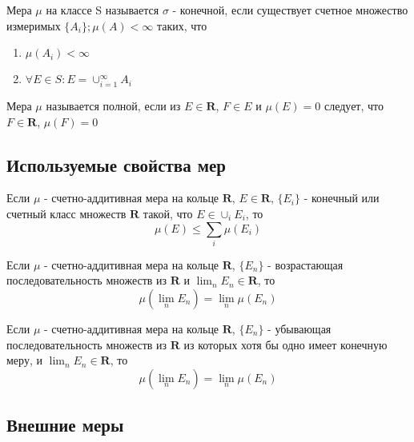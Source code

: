 \begin{definition} Мера $\mu$ на классе S называется $\sigma$ - конечной, если существует счетное множество измеримых $\{A_i\}; \mu(A) < \infty$ таких, что
\begin{enumerate}
	\item $\mu(A_i) < \infty$
	\item $\forall E \in S: E = \cup_{i = 1}^{\infty} A_i$
\end{enumerate}
\end{definition}

\begin{definition} Мера $\mu$ называется полной, если из $E \in \textbf{R}$, $F \in E$ и $\mu(E) = 0$ следует, что $F \in \textbf{R}$, $\mu(F) = 0$ 
	\end{definition}

\newpage

\subsection{Используемые свойства мер}

\begin{theorem}
\label{theor_2}
\cite{HalmoshTheoryM1953}
Если $\mu$ - счетно-аддитивная мера на кольце $\textbf{R}$, $E \in \textbf{R}$, $\{E_i\}$ - конечный или счетный класс множеств $\textbf{R}$ такой, что $E \in \cup_i E_i$, то
$$
	\mu(E) \leq \sum_i \mu(E_i)
$$
\end{theorem}

\begin{theorem}
\label{theor_4}
\cite{HalmoshTheoryM1953}
Если $\mu$ - счетно-аддитивная мера на кольце $\textbf{R}$, $\{E_n\}$ - возрастающая последовательность множеств из $\textbf{R}$ и $\lim_n E_n \in \textbf{R} $, то 
$$
\mu(\lim_n E_n) = \lim_n \mu(E_n)
$$
\end{theorem}

\begin{theorem}
\label{theor_5}
\cite{HalmoshTheoryM1953}
Если $\mu$ - счетно-аддитивная мера на кольце $\textbf{R}$, $\{E_n\}$ - убывающая последовательность множеств из $\textbf{R}$ из которых хотя бы одно имеет конечную меру, и  $\lim_n E_n \in \textbf{R} $, то 
$$
\mu(\lim_n E_n) = \lim_n \mu(E_n)
$$
\end{theorem}


\subsection{Внешние меры}

